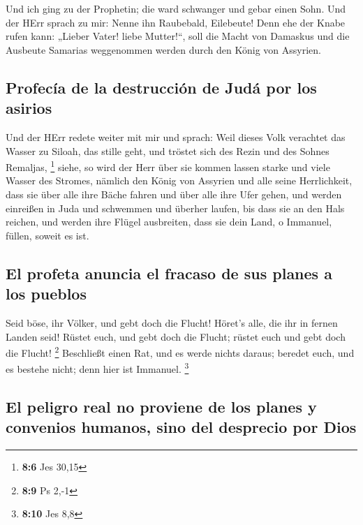  Und ich ging zu der Prophetin; die ward schwanger und
gebar einen Sohn. Und der HErr sprach zu mir: Nenne ihn Raubebald,
Eilebeute!  Denn ehe der Knabe rufen kann: „Lieber Vater!
liebe Mutter!{}``, soll die Macht von Damaskus und die Ausbeute Samarias
weggenommen werden durch den König von Assyrien.

\hypertarget{profecuxeda-de-la-destrucciuxf3n-de-juduxe1-por-los-asirios}{%
\subsection{Profecía de la destrucción de Judá por los
asirios}\label{profecuxeda-de-la-destrucciuxf3n-de-juduxe1-por-los-asirios}}

 Und der HErr redete weiter mit mir und sprach:
 Weil dieses Volk verachtet das Wasser zu Siloah, das
stille geht, und tröstet sich des Rezin und des Sohnes Remaljas,
\footnote{\textbf{8:6} Jes 30,15}  siehe, so wird der Herr
über sie kommen lassen starke und viele Wasser des Stromes, nämlich den
König von Assyrien und alle seine Herrlichkeit, dass sie über alle ihre
Bäche fahren und über alle ihre Ufer gehen,  und werden
einreißen in Juda und schwemmen und überher laufen, bis dass sie an den
Hals reichen, und werden ihre Flügel ausbreiten, dass sie dein Land, o
Immanuel, füllen, soweit es ist.

\hypertarget{el-profeta-anuncia-el-fracaso-de-sus-planes-a-los-pueblos}{%
\subsection{El profeta anuncia el fracaso de sus planes a los
pueblos}\label{el-profeta-anuncia-el-fracaso-de-sus-planes-a-los-pueblos}}

 Seid böse, ihr Völker, und gebt doch die Flucht! Höret's
alle, die ihr in fernen Landen seid! Rüstet euch, und gebt doch die
Flucht; rüstet euch und gebt doch die Flucht! \footnote{\textbf{8:9} Ps
  2,-1}  Beschließt einen Rat, und es werde nichts
daraus; beredet euch, und es bestehe nicht; denn hier ist Immanuel.
\footnote{\textbf{8:10} Jes 8,8}

\hypertarget{el-peligro-real-no-proviene-de-los-planes-y-convenios-humanos-sino-del-desprecio-por-dios}{%
\subsection{El peligro real no proviene de los planes y convenios
humanos, sino del desprecio por
Dios}\label{el-peligro-real-no-proviene-de-los-planes-y-convenios-humanos-sino-del-desprecio-por-dios}}


